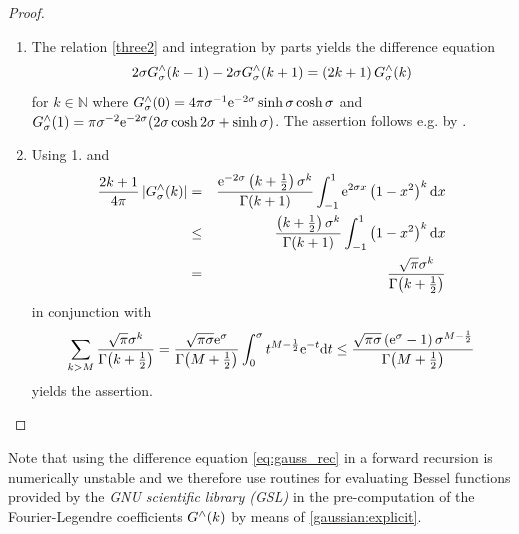 \documentclass[11pt,a4paper,twoside,bibtotoc]{scrartcl}
\theoremstyle{plain}
\theoremstyle{definition}
\theoremstyle{remark}
\newcommand{\N}{\ensuremath{\mathbb{N}}}
\newcommand{\fun}[2]{\ensuremath{#1{\hspace{-0.4ex}}\left(#2\right)}}
\newcommand{\dx}{\text{\rm{d}}}
\newcommand{\e}{\mbox{\rm{e}}}
\numberwithin{equation}{section}
\numberwithin{table}{section}
\numberwithin{figure}{section}
\begin{document}
\begin{proof}
  ${}^{}$\\[-2ex]
  \begin{enumerate}
  \item The relation \eqref{three2} and integration by parts yields the
    difference equation
    \begin{equation}\label{eq:gauss_rec}
    {2\sigma}\fun{G_{\sigma}^{\wedge}}{k-1} - {2\sigma}\fun{G_{\sigma}^{\wedge}}{k+1} = 
    \left(2k+1\right)\fun{G_{\sigma}^{\wedge}}{k}
    \end{equation}
    for $k\in \N$ where $\fun{G_{\sigma}^{\wedge}}{0} = 4 \pi \sigma^{-1}
    \e^{-2\sigma} \sinh \sigma \cosh \sigma$ and
    $\fun{G_{\sigma}^{\wedge}}{1} = \pi \sigma^{-2} \e^{-2\sigma} (2 \sigma
    \cosh 2 \sigma + \sinh \sigma )$.
    The assertion follows e.g. by \cite{bahu01}.
  \item Using 1. and
  \begin{eqnarray*}
    \frac{2k+1}{4\pi} \left|\fun{G_{\sigma}^{\wedge}}{k}\right|
    &=&
    \frac{\e^{-2\sigma}
    \left(k+\frac{1}{2}\right)\sigma^k}{\fun{\Gamma}{k+1}} \int_{-1}^{1}
    \e^{2\sigma x} \left(1-x^2\right)^k \dx x\\
    &\le&
    \frac{\left(k+\frac{1}{2}\right)\sigma^k}{\fun{\Gamma}{k+1}}
    \int_{-1}^{1} \left(1-x^2\right)^k \dx x\\
    &=&
    \frac{\sqrt{\pi}\sigma^k}{\fun{\Gamma}{k+\frac{1}{2}}}
  \end{eqnarray*}
  in conjunction with
  \begin{equation*}
    \sum_{k>M} \frac{\sqrt{\pi}\sigma^k}{\fun{\Gamma}{k+\frac{1}{2}}}\\
    =
    \frac{\sqrt{\pi\sigma}\e^{\sigma}}{\fun{\Gamma}{M+\frac{1}{2}}} 
    \int_{0}^{\sigma} t^{M-\frac{1}{2}} \e^{-t} \dx t\\
    \le
    \frac{\sqrt{\pi\sigma}\left(\e^{\sigma}-1\right)
    \sigma^{M-\frac{1}{2}}}{\fun{\Gamma}{M+\frac{1}{2}}}
  \end{equation*}
  yields the assertion.
\end{enumerate}
\end{proof}

Note that using the difference equation \eqref{eq:gauss_rec} in a forward
recursion is numerically unstable and we therefore use routines for
evaluating Bessel functions provided by
the \emph{GNU scientific library (GSL)} \cite{gsl} in the
pre-computation of the Fourier-Legendre coefficients $\fun{G^{\wedge}}{k}$ 
by means of \eqref{gaussian:explicit}.
\end{document}

